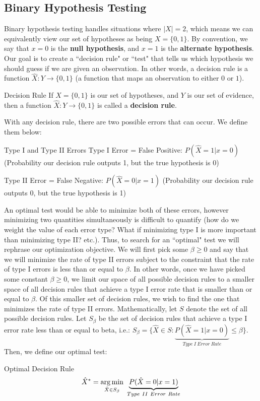 \subsection{Binary Hypothesis Testing}
Binary hypothesis testing handles situations where \(|X| = 2\), which means we can equivalently view our set of hypotheses as being \(X = \{0, 1\}\). By convention, we say that \(x=0\) is the \textbf{null hypothesis}, and \(x=1\) is the \textbf{alternate hypothesis}. Our goal is to create a ``decision rule" or ``test" that tells us which hypothesis we should guess if we are given an observation. In other words, a decision rule is a function \(\hat{X}:Y \to\{0, 1\}\) (a function that maps an observation to either \(0\) or \(1\)). 
\begin{defn}{Decision Rule}{}
If \(X = \{0, 1\}\) is our set of hypotheses, and \(Y\) is our set of evidence, then a function \(\hat{X}:Y \to\{0, 1\}\) is called a \textbf{decision rule}.
\end{defn}

With any decision rule, there are two possible errors that can occur. We define them below:

\begin{defn}{Type I and Type II Errors}{}
Type I Error = False Positive: \(P(\hat{X} = 1 |x=0)\) (Probability our decision rule outputs 1, but the true hypothesis is 0) \newline 

Type II Error = False Negative: \(P(\hat{X} = 0 |x=1)\) (Probability our decision rule outputs 0, but the true hypothesis is 1) \newline 
\end{defn}

An optimal test would be able to minimize both of these errors, however minimizing two quantities simultaneously is difficult to quantify (how do we weight the value of each error type? What if minimizing type I is more important than minimizing type II? etc.). Thus, to search for an ``optimal" test we will rephrase our optimization objective. We will first pick some \(\beta \geq 0\) and say that we will minimize the rate of type II errors subject to the constraint that the rate of type I errors is less than or equal to \(\beta\). In other words, once we have picked some constant \(\beta \geq 0\), we limit our space of all possible decision rules to a smaller space of all decision rules that achieve a type I error rate that is smaller than or equal to \(\beta\). Of this smaller set of decision rules, we wish to find the one that minimizes the rate of type II errors. Mathematically, let \(S\) denote the set of all possible decision rules. Let \(S_\beta\) be the set of decision rules that achieve a type I error rate less than or equal to beta, i.e.: \(S_\beta = \{\hat{X} \in S : \underbrace{P(\hat{X} = 1 |x=0)}_{Type\ I\ Error\ Rate} \leq \beta\}\). Then, we define our optimal test:
\begin{defn}{Optimal Decision Rule}{}
\begin{equation*}
  \hat{X}^* = \underset{\hat{X}\in S_\beta}{\argmin}\ \underbrace{P(\hat{X} = 0 |x=1)}_{Type\ II\ Error\ Rate}
\end{equation*}
\end{defn}

